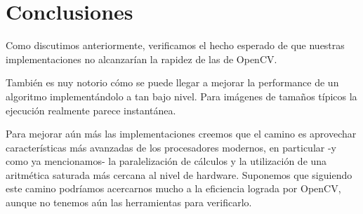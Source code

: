\section{Conclusiones}

Como discutimos anteriormente, verificamos el hecho esperado de que nuestras implementaciones no alcanzarían la rapidez de las de OpenCV.

También es nuy notorio cómo se puede llegar a mejorar la performance de un algoritmo implementándolo a tan bajo nivel. Para imágenes de tamaños típicos la ejecución realmente parece instantánea.

Para mejorar aún más las implementaciones creemos que el camino es aprovechar características más avanzadas de los procesadores modernos, en particular -y como ya mencionamos- la paralelización de cálculos y la utilización de una aritmética saturada más cercana al nivel de hardware. Suponemos que siguiendo este camino podríamos acercarnos mucho a la eficiencia lograda por OpenCV, aunque no tenemos aún las herramientas para verificarlo.
